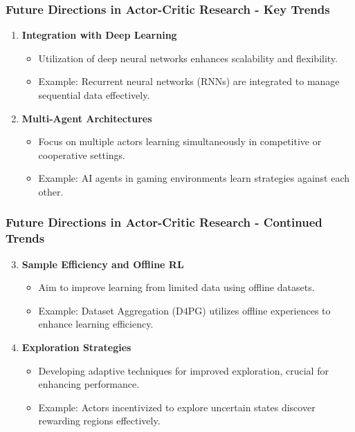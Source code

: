 \documentclass[aspectratio=169]{beamer}
\begin{document}
\begin{frame}[fragile]
    \frametitle{Future Directions in Actor-Critic Research - Key Trends}
    \begin{enumerate}
        \item \textbf{Integration with Deep Learning}
            \begin{itemize}
                \item Utilization of deep neural networks enhances scalability and flexibility.
                \item Example: Recurrent neural networks (RNNs) are integrated to manage sequential data effectively.
            \end{itemize}
        \item \textbf{Multi-Agent Architectures}
            \begin{itemize}
                \item Focus on multiple actors learning simultaneously in competitive or cooperative settings.
                \item Example: AI agents in gaming environments learn strategies against each other.
            \end{itemize}
    \end{enumerate}
\end{frame}

\begin{frame}[fragile]
    \frametitle{Future Directions in Actor-Critic Research - Continued Trends}
    \begin{enumerate}
        \setcounter{enumi}{2} %
        \item \textbf{Sample Efficiency and Offline RL}
            \begin{itemize}
                \item Aim to improve learning from limited data using offline datasets.
                \item Example: Dataset Aggregation (D4PG) utilizes offline experiences to enhance learning efficiency.
            \end{itemize}
        \item \textbf{Exploration Strategies}
            \begin{itemize}
                \item Developing adaptive techniques for improved exploration, crucial for enhancing performance.
                \item Example: Actors incentivized to explore uncertain states discover rewarding regions effectively.
            \end{itemize}
    \end{enumerate}
\end{frame}
\end{document}
